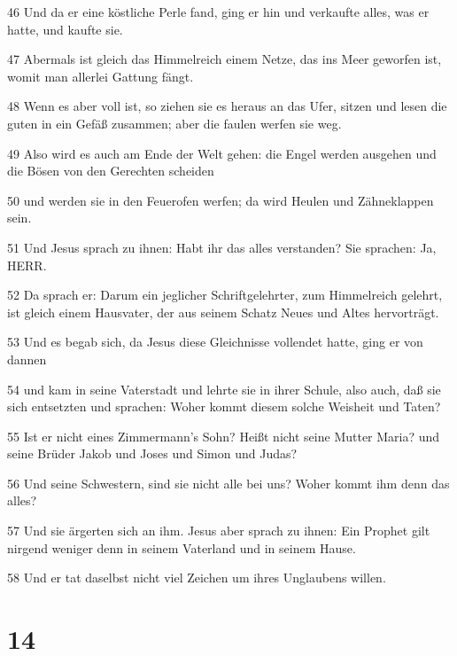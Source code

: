 \par 46 Und da er eine köstliche Perle fand, ging er hin und verkaufte alles, was er hatte, und kaufte sie.
\par 47 Abermals ist gleich das Himmelreich einem Netze, das ins Meer geworfen ist, womit man allerlei Gattung fängt.
\par 48 Wenn es aber voll ist, so ziehen sie es heraus an das Ufer, sitzen und lesen die guten in ein Gefäß zusammen; aber die faulen werfen sie weg.
\par 49 Also wird es auch am Ende der Welt gehen: die Engel werden ausgehen und die Bösen von den Gerechten scheiden
\par 50 und werden sie in den Feuerofen werfen; da wird Heulen und Zähneklappen sein.
\par 51 Und Jesus sprach zu ihnen: Habt ihr das alles verstanden? Sie sprachen: Ja, HERR.
\par 52 Da sprach er: Darum ein jeglicher Schriftgelehrter, zum Himmelreich gelehrt, ist gleich einem Hausvater, der aus seinem Schatz Neues und Altes hervorträgt.
\par 53 Und es begab sich, da Jesus diese Gleichnisse vollendet hatte, ging er von dannen
\par 54 und kam in seine Vaterstadt und lehrte sie in ihrer Schule, also auch, daß sie sich entsetzten und sprachen: Woher kommt diesem solche Weisheit und Taten?
\par 55 Ist er nicht eines Zimmermann's Sohn? Heißt nicht seine Mutter Maria? und seine Brüder Jakob und Joses und Simon und Judas?
\par 56 Und seine Schwestern, sind sie nicht alle bei uns? Woher kommt ihm denn das alles?
\par 57 Und sie ärgerten sich an ihm. Jesus aber sprach zu ihnen: Ein Prophet gilt nirgend weniger denn in seinem Vaterland und in seinem Hause.
\par 58 Und er tat daselbst nicht viel Zeichen um ihres Unglaubens willen.

\chapter{14}

